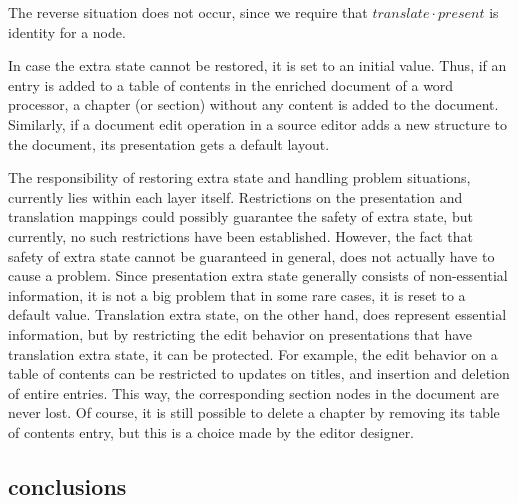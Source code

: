 The reverse situation does not occur, since we require that $translate \cdot present$ is identity for a node. 

In case the extra state cannot be restored, it is set to an initial value. Thus, if an entry is added to a table of contents in the enriched document of a word processor, a chapter (or section) without any content is added to the document. Similarly, if a document edit operation in a source editor adds a new structure to the document, its presentation gets a default layout.

The responsibility of restoring extra state and handling problem situations, currently lies within each layer itself. Restrictions on the presentation and translation mappings could possibly guarantee the safety of extra state, but currently, no such restrictions have been established. However, the fact that safety of extra state cannot be guaranteed in general, does not actually have to cause a problem. Since presentation extra state generally consists of non-essential information, it is not a big problem that in some rare cases, it is reset to a default value.  Translation extra state, on the other hand, does represent essential information, but by restricting the edit behavior on presentations that have translation extra state, it can be protected. For example, the edit behavior on a table of contents can be restricted to updates on titles, and insertion and deletion of entire entries. This way, the corresponding section nodes in the document are never lost. Of course, it is still possible to delete a chapter by removing its table of contents entry, but this is a choice made by the editor designer. 





\subsection{conclusions}

